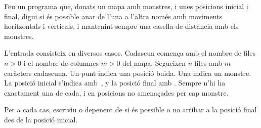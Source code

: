

\Statement

Feu un programa que, donats un mapa amb monstres,
i unes posicions inicial i final,
digui si és possible anar de l'una a l'altra
només amb moviments horitzontals i verticals,
i mantenint sempre una casella de distància amb els monstres.


\Input

L'entrada consisteix en diversos casos.
Cadascun comença amb el nombre de files $n > 0$
i el nombre de columnes $m > 0$ del mapa.
Segueixen $n$ files amb $m$ caràcters cadascuna.
Un punt indica una posició buida.
Una  indica un monstre.
La posició inicial s'indica amb~,
y la posició final amb .
Sempre n'hi ha exactament una de cada,
i en posicions no amenaçades per cap monstre.


\Output

Per a cada cas,
escriviu  o 
depenent de si és possible o no
arribar a la posició final des de la posició inicial.


\Sample
